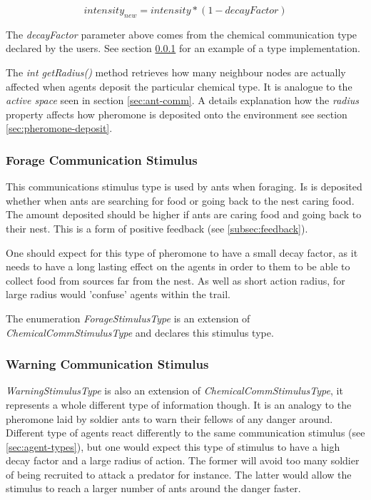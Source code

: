 \begin{equation}
intensity_{new} = intensity * (1 - decayFactor)
\end{equation}

The \emph{decayFactor} parameter above comes from the chemical communication type declared by the users. See section \ref{subsec:forage-stimulus} for an example of a type implementation.

The \emph{int getRadius()} method retrieves how many neighbour nodes are actually affected when agents deposit the particular chemical type. It is analogue to the \emph{active space} seen in section \ref{sec:ant-comm}. A details explanation how the \emph{radius} property affects how pheromone is deposited onto the environment see section \ref{sec:pheromone-deposit}.

\subsubsection {Forage Communication Stimulus}
\label{subsec:forage-stimulus}

This communications stimulus type is used by ants when foraging. Is is deposited whether when ants are searching for food or going back to the nest caring food. The amount deposited should be higher if ants are caring food and going back to their nest. This is a form of positive feedback (see \ref{subsec:feedback}).

One should expect for this type of pheromone to have a small decay factor, as it needs to have a long lasting effect on the agents in order to them to be able to collect food from sources far from the nest. As well as short action radius, for large radius would 'confuse' agents within the trail.

The enumeration \emph{ForageStimulusType} is an extension of \emph{ChemicalCommStimulusType} and declares this stimulus type.

\subsubsection {Warning Communication Stimulus}

\emph{WarningStimulusType} is also an extension of \emph{ChemicalCommStimulusType}, it represents a whole different type of information though. It is an analogy to the pheromone laid by soldier ants to warn their fellows of any danger around. Different type of agents react differently to the same communication stimulus (see \ref{sec:agent-types}), but one would expect this type of stimulus to have a high decay factor and a large radius of action. The former will avoid too many soldier of being recruited to attack a predator for instance. The latter would allow the stimulus to reach a larger number of ants around the danger faster.

